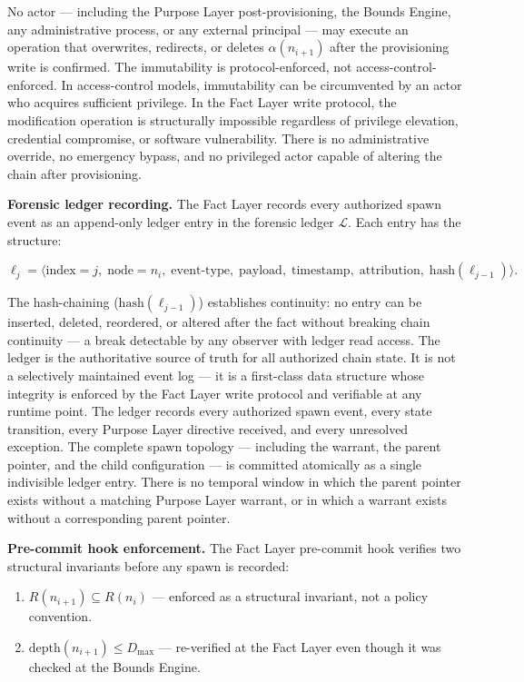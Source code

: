 No actor — including the Purpose Layer post-provisioning, the Bounds Engine, any administrative process, or any external principal — may execute an operation that overwrites, redirects, or deletes $\alpha(n_{i+1})$ after the provisioning write is confirmed. The immutability is protocol-enforced, not access-control-enforced. In access-control models, immutability can be circumvented by an actor who acquires sufficient privilege. In the Fact Layer write protocol, the modification operation is structurally impossible regardless of privilege elevation, credential compromise, or software vulnerability. There is no administrative override, no emergency bypass, and no privileged actor capable of altering the chain after provisioning.

\medskip
\noindent\textbf{Forensic ledger recording.} The Fact Layer records every authorized spawn event as an append-only ledger entry in the forensic ledger $\mathcal{L}$. Each entry has the structure:

\begin{equation}
\ell_j = \bigl\langle
\text{index}=j,\;
\text{node}=n_i,\;
\text{event-type},\;
\text{payload},\;
\text{timestamp},\;
\text{attribution},\;
\text{hash}(\ell_{j-1})
\bigr\rangle .
\label{eq:rs-ledger-entry}
\end{equation}

The hash-chaining ($\text{hash}(\ell_{j-1})$) establishes continuity: no entry can be inserted, deleted, reordered, or altered after the fact without breaking chain continuity — a break detectable by any observer with ledger read access. The ledger is the authoritative source of truth for all authorized chain state. It is not a selectively maintained event log — it is a first-class data structure whose integrity is enforced by the Fact Layer write protocol and verifiable at any runtime point. The ledger records every authorized spawn event, every state transition, every Purpose Layer directive received, and every unresolved exception. The complete spawn topology — including the warrant, the parent pointer, and the child configuration — is committed atomically as a single indivisible ledger entry. There is no temporal window in which the parent pointer exists without a matching Purpose Layer warrant, or in which a warrant exists without a corresponding parent pointer.

\medskip
\noindent\textbf{Pre-commit hook enforcement.} The Fact Layer pre-commit hook verifies two structural invariants before any spawn is recorded:

\begin{enumerate}
    \item[(FC1)] $R(n_{i+1}) \subseteq R(n_i)$ — enforced as a structural invariant, not a policy convention.
    \item[(FC2)] $\text{depth}(n_{i+1}) \leq D_{\max}$ — re-verified at the Fact Layer even though it was checked at the Bounds Engine.
\end{enumerate}


